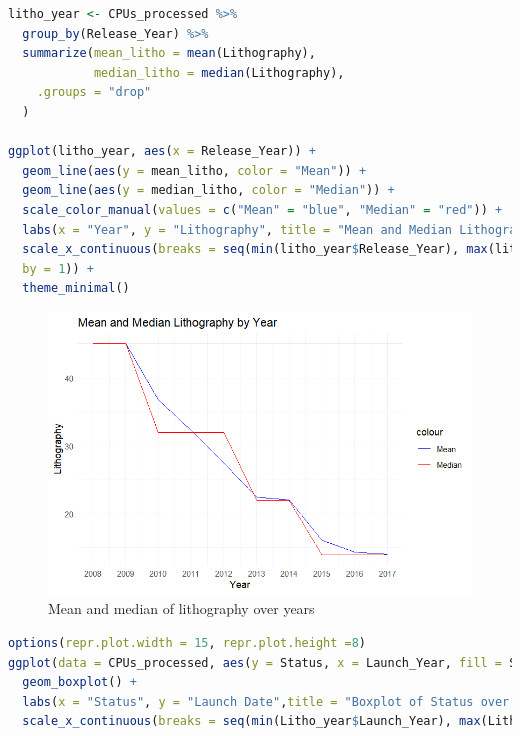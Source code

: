 \begin{lstlisting}[language=R]
litho_year <- CPUs_processed %>% 
  group_by(Release_Year) %>%
  summarize(mean_litho = mean(Lithography),
            median_litho = median(Lithography),
    .groups = "drop"
  )

ggplot(litho_year, aes(x = Release_Year)) +
  geom_line(aes(y = mean_litho, color = "Mean")) +
  geom_line(aes(y = median_litho, color = "Median")) +
  scale_color_manual(values = c("Mean" = "blue", "Median" = "red")) +
  labs(x = "Year", y = "Lithography", title = "Mean and Median Lithography by Year") +
  scale_x_continuous(breaks = seq(min(litho_year$Release_Year), max(litho_year$Release_Year),
  by = 1)) +
  theme_minimal()
\end{lstlisting}

\begin{figure}[ht]
  \centering
  \includegraphics[width=1\linewidth]{img/Litho_Year.png}
  \vspace{1pt}
  \caption{Mean and median of lithography over years}
\end{figure}

\begin{lstlisting}[language=R]
options(repr.plot.width = 15, repr.plot.height =8) 
ggplot(data = CPUs_processed, aes(y = Status, x = Launch_Year, fill = Status)) +
  geom_boxplot() +
  labs(x = "Status", y = "Launch Date",title = "Boxplot of Status over Year") +
  scale_x_continuous(breaks = seq(min(Litho_year$Launch_Year), max(Litho_year$Launch_Year), by = 1))
\end{lstlisting}


